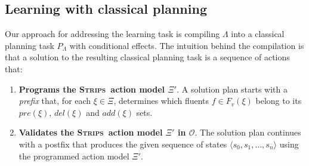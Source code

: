 \documentclass{article}
\newcommand{\tup}[1]{{\langle #1 \rangle}}
\newcommand{\strips}{\textsc{Strips}}     %
\begin{document}
\subsection{Learning with classical planning}

Our approach for addressing the learning task is compiling $\Lambda$ into a classical planning task $P_{\Lambda}$ with conditional effects. The intuition behind the compilation is that a solution to the resulting classical planning task is a sequence of actions that:

\begin{enumerate}
\item {\bf Programs the \strips\ action model $\Xi'$}. A solution plan starts with a {\em prefix} that, for each $\xi\in\Xi$, determines which fluents $f\in F_v(\xi)$ belong to its $pre(\xi)$, $del(\xi)$ and $add(\xi)$ sets.
\item {\bf Validates the \strips\ action model $\Xi'$ in $\mathcal{O}$}. The solution plan continues with a postfix that produces the given sequence of states $\tup{s_0,s_1,\ldots,s_{n}}$ using the programmed action model $\Xi'$.
\end{enumerate}
\end{document}
